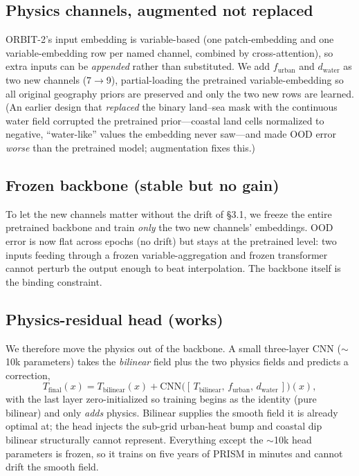 \documentclass[11pt]{article}
\begin{document}
\subsection{Physics channels, augmented not replaced}
ORBIT-2's input embedding is variable-based (one patch-embedding and one
variable-embedding row per named channel, combined by cross-attention), so extra
inputs can be \emph{appended} rather than substituted. We add $f_\text{urban}$ and
$d_\text{water}$ as two new channels (7$\to$9), partial-loading the pretrained
variable-embedding so all original geography priors are preserved and only the two
new rows are learned. (An earlier design that \emph{replaced} the binary land--sea
mask with the continuous water field corrupted the pretrained prior---coastal land
cells normalized to negative, ``water-like'' values the embedding never saw---and
made OOD error \emph{worse} than the pretrained model; augmentation fixes this.)

\subsection{Frozen backbone (stable but no gain)}
To let the new channels matter without the drift of \S3.1, we freeze the entire
pretrained backbone and train \emph{only} the two new channels' embeddings. OOD
error is now flat across epochs (no drift) but stays at the pretrained level: two
inputs feeding through a frozen variable-aggregation and frozen transformer cannot
perturb the output enough to beat interpolation. The backbone itself is the
binding constraint.

\subsection{Physics-residual head (works)}
We therefore move the physics out of the backbone. A small three-layer CNN
($\sim$10k parameters) takes the \emph{bilinear} field plus the two physics fields
and predicts a correction,
\begin{equation}
T_{\text{final}}(x) = T_{\text{bilinear}}(x) +
\text{CNN}\bigl([\,T_{\text{bilinear}},\, f_{\text{urban}},\, d_{\text{water}}\,]\bigr)(x),
\label{eq:head}
\end{equation}
with the last layer zero-initialized so training begins as the identity (pure
bilinear) and only \emph{adds} physics. Bilinear supplies the smooth field it is
already optimal at; the head injects the sub-grid urban-heat bump and coastal dip
bilinear structurally cannot represent. Everything except the $\sim$10k head
parameters is frozen, so it trains on five years of PRISM in minutes and cannot
drift the smooth field.
\end{document}
